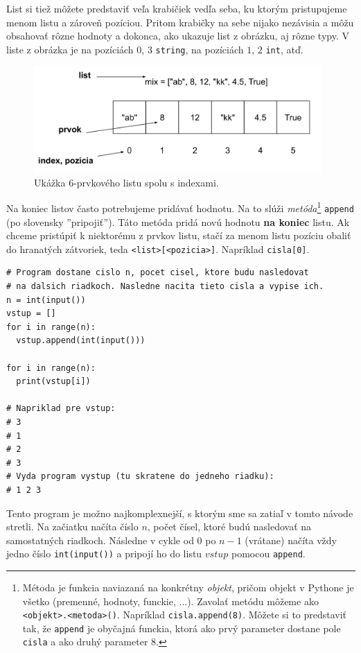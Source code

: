 List si tiež môžete predstaviť veľa krabičiek vedľa seba, ku ktorým pristupujeme menom listu a zároveň pozíciou. Pritom krabičky na sebe nijako nezávisia a môžu obsahovať rôzne hodnoty a dokonca, ako ukazuje list z obrázku, aj rôzne typy. V liste z obrázka je na pozíciách $0$, $3$ \texttt{string}, na pozíciách $1$, $2$ \texttt{int}, atď.
\begin{figure}[h]
\includegraphics[width=11cm]{list}
\centering
\caption{Ukážka 6-prvkového listu spolu s indexami.}
\end{figure}
Na koniec listov často potrebujeme pridávať hodnotu. Na to slúži \textit{metóda}\footnote{Métoda je funkcia naviazaná na konkrétny \textit{objekt}, pričom objekt v Pythone je všetko (premenné, hodnoty, funckie, ...). Zavolať metódu môžeme ako \texttt{<objekt>.<metoda>()}. Napríklad \texttt{cisla.append(8)}. Môžete si to predstaviť tak, že \texttt{append} je obyčajná funckia, ktorá ako prvý parameter dostane pole \texttt{cisla} a ako druhý parameter $8$.}  \texttt{append} (po slovensky ''pripojiť''). Táto metóda pridá novú hodnotu \textbf{na koniec} listu. Ak chceme pristúpiť k niektorému z prvkov listu, stačí za menom listu pozíciu obaliť do hranatých zátvoriek, teda \texttt{<list>[<pozicia>]}. Napríklad \texttt{cisla[0]}.
\begin{lstlisting}
# Program dostane cislo n, pocet cisel, ktore budu nasledovat
# na dalsich riadkoch. Nasledne nacita tieto cisla a vypise ich.
n = int(input())
vstup = []
for i in range(n):
  vstup.append(int(input()))

for i in range(n):
  print(vstup[i])

# Napriklad pre vstup:
# 3
# 1
# 2
# 3
# Vyda program vystup (tu skratene do jedneho riadku):
# 1 2 3
\end{lstlisting}

Tento program je možno najkomplexnejší, s ktorým sme sa zatiaľ v tomto návode stretli. Na začiatku načíta číslo $n$, počet čísel, ktoré budú nasledovať na samostatných riadkoch. Následne v cykle od $0$ po $n - 1$ (vrátane) načíta vždy jedno číslo \texttt{int(input())} a pripojí ho do listu $vstup$ pomocou \texttt{append}.

